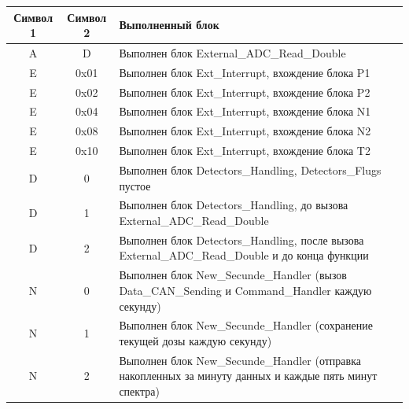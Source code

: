 \begin{center}
	\begin{tabularx}{\textwidth}{|c|c|X|}
		\hline
		Символ 1 & Символ 2 & Выполненный 
		блок                                                                    
		                    \\
		 \hline
		   A     &    D     & Выполнен блок 
		   External\_ADC\_Read\_Double                                          
		                        \\
		    \hline
		   E     &   0x01   & Выполнен блок Ext\_Interrupt, вхождение блока 
		   P1                                                        \\ \hline
		   E     &   0x02   & Выполнен блок Ext\_Interrupt, вхождение блока 
		   P2                                                        \\ \hline
		   E     &   0x04   & Выполнен блок Ext\_Interrupt, вхождение блока 
		   N1                                                        \\ \hline
		   E     &   0x08   & Выполнен блок Ext\_Interrupt, вхождение блока 
		   N2                                                        \\ \hline
		   E     &   0x10   & Выполнен блок Ext\_Interrupt, вхождение блока 
		   T2                                                        \\ \hline
		   D     &    0     & Выполнен блок Detectors\_Handling, 
		   Detectors\_Flugs пустое                                              
		   \\ \hline
		   D     &    1     & Выполнен блок Detectors\_Handling, до вызова 
		   External\_ADC\_Read\_Double                                \\ \hline
		   D     &    2     & Выполнен блок Detectors\_Handling, после вызова 
		   External\_ADC\_Read\_Double и до конца функции          \\ \hline
		   N     &    0     & Выполнен блок New\_Secunde\_Handler (вызов 
		   Data\_CAN\_Sending и Command\_Handler каждую секунду)        \\ 
		   \hline
		   N     &    1     & Выполнен блок New\_Secunde\_Handler (сохранение 
		   текущей дозы каждую секунду)                            \\ \hline
		   N     &    2     & Выполнен блок New\_Secunde\_Handler (отправка 
		   накопленных за минуту данных и каждые пять минут спектра) \\ \hline
	\end{tabularx}  
\end{center}
\normalsize





